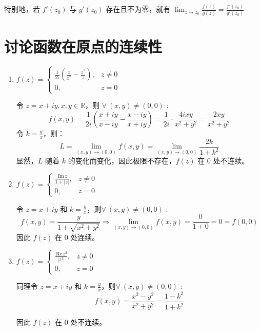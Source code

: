 \documentclass[UTF8]{report}
\def\Im{\mathrm{\,Im\,}}
\def\Re{\mathrm{\,Re\,}}
\def\R{\mathbb{R}}
\theoremstyle{MyLineTheoremStyle} %
\theoremstyle{MyBlockTheoremStyle} %
\theoremstyle{MySubsubsectionStyle} %
\begin{document}
特别地，若 $f'(z_0)$ 与 $g'(z_0)$ 存在且不为零，就有 $\lim_{z\to z_0} \frac{f(z)}{g(z)} = \frac{f'(z_0)}{g'(z_0)}$

\section{讨论函数在原点的连续性}

\begin{enumerate}
\item $f(z) = \begin{cases}
    \frac{1}{2i}(\frac{z}{z^*} - \frac{z^*}{z}), & z \neq 0 \\ 
    0, & z = 0
\end{cases}$

令 $z = x + iy, x,y \in \R$，则 $\forall\ (x,y) \ne (0,0)$ :
\begin{equation*}
f(x,y) 
= \frac{1}{2i} \left(\frac{x+iy}{x-iy} - \frac{x-iy}{x+iy}\right) 
= \frac{1}{2i} \cdot \frac{ 4ixy }{x^2 + y^2} = \frac{2xy}{x^2 + y^2} 
\end{equation*}
令 $k = \frac{y}{x}$，则：
\begin{equation*}
L = \lim_{(x,y) \to (0,0)} f(x,y) 
= \lim_{(x,y) \to (0,0)} \frac{2k}{1+k^2}
\end{equation*}
显然，$L$ 随着 $k$ 的变化而变化，因此极限不存在，$f(z)$ 在 $0$ 处不连续。

\item $f(z) = \begin{cases}
    \frac{\Im z}{1 + | z |}, & z \neq 0 \\ 
    0, & z = 0
\end{cases}$

令 $z = x + iy$ 和 $k = \frac{y}{x}$，则$\forall\ (x,y) \ne (0,0)$ :
\begin{equation*}
    f(x,y) = \frac{y}{1+\sqrt{x^2+y^2}} \Longrightarrow \lim_{(x,y) \to (0,0)} f(x,y) = \frac{0}{1+0} = 0 = f(0,0) 
\end{equation*}
因此 $f(z)$ 在 0 处连续。

\item  $f(z) = \begin{cases}
    \frac{\Re z^2}{| z^2 |}, & z \neq 0 \\ 
    0, & z = 0
\end{cases}$

同理令 $z = x + iy$ 和 $k = \frac{y}{x}$，则$\forall\ (x,y) \ne (0,0)$ :
\begin{equation*}
f(x,y) = \frac{x^2 - y^2}{ x^2 + y^2 } = \frac{1-k^2}{1+k^2} 
\end{equation*}

因此 $f(z)$ 在 0 处不连续。

\end{enumerate}
\end{document}
